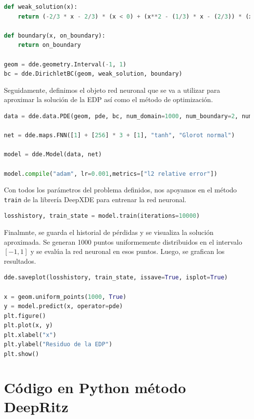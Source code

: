 \documentclass[a4paper,11pt,spanish, twoside, leqno]{tfg-uam}
\theoremstyle{definition}
\begin{document}
\begin{lstlisting}[language=Python]
def weak_solution(x):
    return (-2/3 * x - 2/3) * (x < 0) + (x**2 - (1/3) * x - (2/3)) * (x >= 0)

def boundary(x, on_boundary):
    return on_boundary
    
geom = dde.geometry.Interval(-1, 1)
bc = dde.DirichletBC(geom, weak_solution, boundary)
\end{lstlisting}

Seguidamente, definimos el objeto red neuronal que se va a utilizar para aproximar la solución de la EDP así como el método de optimización. 

\begin{lstlisting}[language=Python]
data = dde.data.PDE(geom, pde, bc, num_domain=1000, num_boundary=2, num_test=100, solution=weak_solution)

net = dde.maps.FNN([1] + [256] * 3 + [1], "tanh", "Glorot normal")

model = dde.Model(data, net)

model.compile("adam", lr=0.001,metrics=["l2 relative error"])
\end{lstlisting}

Con todos los parámetros del problema definidos, nos apoyamos en el método \texttt{train} de la librería DeepXDE para entrenar la red neuronal. 

\begin{lstlisting}[language=Python]
losshistory, train_state = model.train(iterations=10000)
\end{lstlisting}

Finalmnte, se guarda el historial de pérdidas y se visualiza la solución aproximada. Se generan 1000 puntos uniformemente distribuidos en el intervalo $[-1, 1]$ y se evalúa la red neuronal en esos puntos. Luego, se grafican los resultados.

\begin{lstlisting}[language=Python]
dde.saveplot(losshistory, train_state, issave=True, isplot=True)

x = geom.uniform_points(1000, True)
y = model.predict(x, operator=pde)
plt.figure()
plt.plot(x, y)
plt.xlabel("x")
plt.ylabel("Residuo de la EDP")
plt.show()
\end{lstlisting}


\chapter{Código en Python método DeepRitz\label{sec:codigo_deep_ritz}}
\end{document}
